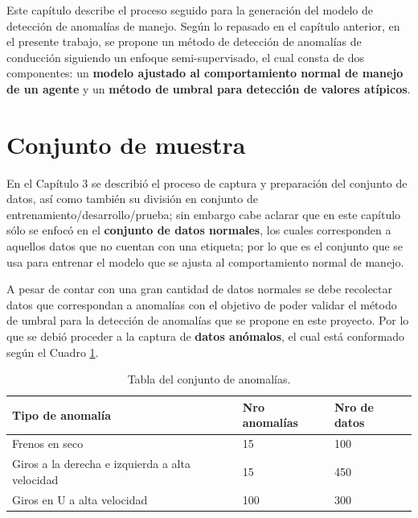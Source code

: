 Este cap\'{i}tulo describe el proceso seguido para la generaci\'{o}n del modelo de detecci\'{o}n de anomal\'{i}as de manejo. Seg\'{u}n lo repasado en el cap\'{i}tulo anterior, en el presente trabajo, se propone un m\'{e}todo de detecci\'{o}n de anomal\'{i}as de conducci\'{o}n siguiendo un enfoque semi-supervisado, el cual consta de dos componentes: un \textbf{modelo ajustado al comportamiento normal de manejo de un agente} y un \textbf{m\'{e}todo de umbral para detecci\'{o}n de valores at\'{i}picos}. 

\section{Conjunto de muestra}

En el Cap\'{i}tulo 3 se describi\'{o} el proceso de captura y preparaci\'{o}n del conjunto de datos, as\'{i} como tambi\'{e}n su divisi\'{o}n en conjunto de entrenamiento/desarrollo/prueba; sin embargo cabe aclarar que en este cap\'{i}tulo s\'{o}lo se enfoc\'{o} en el  \textbf{conjunto de datos normales}, los cuales corresponden a aquellos datos que no cuentan con una etiqueta; por lo que es el conjunto que se usa para entrenar el modelo que se ajusta al comportamiento normal de manejo.

\vspace{5mm} %

A pesar de contar con una gran cantidad de datos normales se debe recolectar datos que correspondan a anomal\'{i}as con el objetivo de poder validar el m\'{e}todo de umbral para la detecci\'{o}n de anomal\'{i}as que se propone en este proyecto. Por lo que se debi\'{o} proceder a la captura de  \textbf{datos an\'{o}malos}, el cual est\'{a} conformado seg\'{u}n el Cuadro \ref{table:conjunto_anomalias}.

\begin{table}[]
\centering
\begin{tabular}{|l|l|l|}
\hline
Tipo de anomal\'{i}a & Nro anomal\'{i}as & Nro de datos \\ \hline
Frenos en seco    & 15  & 100  \\ \hline
Giros a la derecha e izquierda a alta velocidad & 15  & 450  \\ \hline
Giros en U a alta velocidad & 100 & 300 \\ \hline
\end{tabular}
\caption{Tabla del conjunto de anomal\'{i}as.}
\label{table:conjunto_anomalias}
\end{table}

